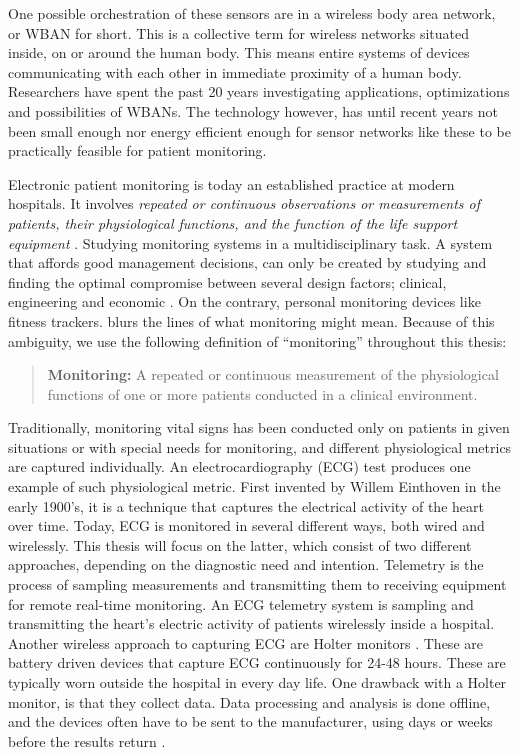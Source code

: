 One possible orchestration of these sensors are in a wireless body area network, or WBAN for short. This is a collective term for wireless networks situated inside, on or around the human body. This means entire systems of devices communicating with each other in immediate proximity of a human body. Researchers have spent the past 20 years investigating applications, optimizations and possibilities of WBANs. The technology however, has until recent years not been small enough nor energy efficient enough for sensor networks like these to be practically feasible for patient monitoring.

Electronic patient monitoring is today an established practice at modern hospitals. It involves \textit{repeated or continuous observations or measurements of patients, their physiological functions, and the function of the life support equipment} \cite{PMID:10315668}. Studying monitoring systems in a multidisciplinary task. A system that affords good management decisions, can only be created by studying and finding the optimal compromise between several design factors; clinical, engineering and economic \cite{Anonymous:yOjY0N0Y}. On the contrary, personal monitoring devices like fitness trackers. blurs the lines of what monitoring might mean. Because of this ambiguity, we use the following definition of ``monitoring'' throughout this thesis: 

\begin{quote}
\textbf{Monitoring:} A repeated or continuous measurement of the physiological functions of one or more patients conducted in a clinical environment.
\end{quote}

\noindent Traditionally, monitoring vital signs has been conducted only on patients in given situations or with special needs for monitoring, and different physiological metrics are captured individually. An electrocardiography (ECG) test produces one example of such physiological metric. First invented by Willem Einthoven in the early 1900's, it is a technique that captures the electrical activity of the heart over time. Today, ECG is monitored in several different ways, both wired and wirelessly. This thesis will focus on the latter, which consist of two different approaches, depending on the diagnostic need and intention. Telemetry is the process of sampling measurements and transmitting them to receiving equipment for remote real-time monitoring. An ECG telemetry system is sampling and transmitting the heart's electric activity of patients wirelessly inside a hospital. Another wireless approach to capturing ECG are Holter monitors \cite{holter:13}. These are battery driven devices that capture ECG continuously for 24-48 hours. These are typically worn outside the hospital in every day life. One drawback with a Holter monitor, is that they collect data. Data processing and analysis is done offline, and the devices often have to be sent to the manufacturer, using days or weeks before the results return \cite{ziopatch:14}.

